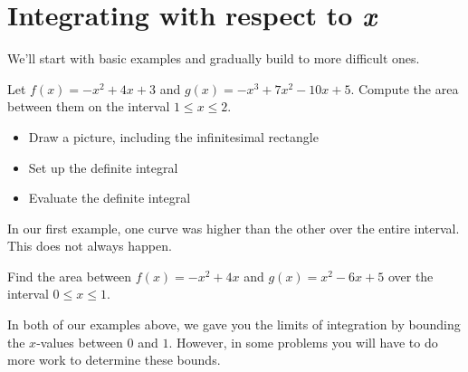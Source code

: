 \documentclass[handout]{ximera}
\begin{document}
\section{Integrating with respect to \textit{x}}

We'll start with basic examples and gradually build to more difficult
ones.

\begin{question}
  Let $f(x) = -x^2+4x+3$ and $g(x)=-x^3+7x^2-10x+5$. Compute the area
  between them on the interval $1 \le x \le 2$.
  
  	\begin{itemize}
  		\item Draw a picture, including the infinitesimal rectangle
  		\item Set up the definite integral
  		\item Evaluate the definite integral
  	\end{itemize}
  	
\newpage
\end{question}



In our first example, one curve was higher than the other over the
entire interval. This does not always happen.

\begin{question} 
Find the area between $f(x)= -x^2+4x$ and
$g(x)=x^2-6x+5$ over the interval $0 \le x \le 1$.

\newpage
\end{question}


In both of our examples above, we gave you the limits of integration
by bounding the $x$-values between $0$ and $1$. However, in some problems
you will have to do more work to determine these bounds.
\end{document}
